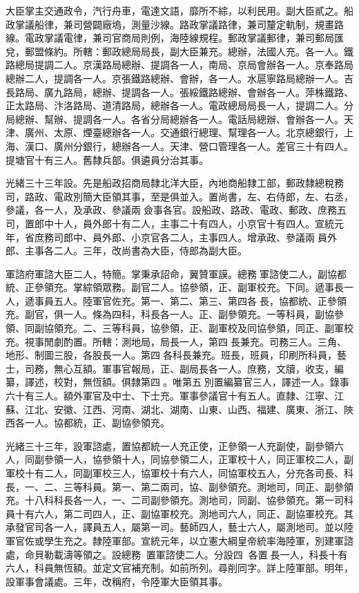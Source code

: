 \begin{pinyinscope}
大臣掌主交通政令，汽行舟車，電達文語，靡所不綜，以利民用。副大臣貳之。船政掌議船律，兼司營闢廠塢，測量沙線。路政掌議路律，兼司釐定軌制，規畫路線。電政掌議電律，兼司官商局則例，海陸線規程。郵政掌議郵律，兼司郵局匯兌，郵盟條約。所轄：郵政總局局長，副大臣兼充。總辦，法國人充。各一人。鐵路總局提調二人。京漢路局總辦、提調各一人，南局、京局會辦各一人。京奉路局總辦二人，提調各一人。京張鐵路總辦、會辦，各一人。水扈寧路局總辦一人。吉長路局、廣九路局，總辦、提調各一人。張綏鐵路總辦、會辦各一人。萍株鐵路、正太路局、汴洛路局、道清路局，總辦各一人。電政總局局長一人，提調二人。分局總辦、幫辦、提調各一人。各省分局總辦各一人。電話局總辦、會辦各一人。天津、廣州、太原、煙臺總辦各一人。交通銀行總理、幫理各一人。北京總銀行，上海、漢口、廣州分銀行，總辦各一人。天津、營口管理各一人。差官三十有四人。提塘官十有三人。舊隸兵部。俱遴員分治其事。

光緒三十三年設。先是船政招商局隸北洋大臣，內地商船隸工部，郵政隸總稅務司，路政、電政別簡大臣領其事，至是俱並入。置尚書，左、右侍郎，左、右丞，參議，各一人，及承政、參議兩僉事各官。設船政、路政、電政、郵政、庶務五司，置郎中十人，員外郎十有二人，主事二十有四人，小京官十有四人。宣統元年，省庶務司郎中、員外郎、小京官各二人，主事四人。增承政、參議兩員外郎、主事各二人。三年，改尚書為大臣，侍郎為副大臣。

軍諮府軍諮大臣二人，特簡。掌秉承詔命，翼贊軍謨。總務軍諮使二人，副協都統、正參領充。掌綜領眾務。副官二人。協參領，正、副軍校充。下同。遞事長一人，遞事員五人。陸軍官佐充。第一、第二、第三、第四各長，協都統、正參領充。副官，俱一人。條為四科，科長各一人。正、副參領充。一等科員，副協參領、同副協領充。二、三等科員，協參領，正、副軍校及同協參領，同正、副軍校充。視事閒劇酌置。所轄：測地局，局長一人，第四長兼充。司務三人。三角、地形、制圖三股，各股長一人。第四各科長兼充。班長，班員，印刷所科員，藝士，司務，無心互額。軍事官報局，正、副局長各一人。庶務，文牘，收支，編纂，譯述，校對，無恆額。俱隸第四。唯第五別置編纂官三人，譯述一人。錄事六十有三人。額外軍官及中士、下士充。軍事參議官十有五人。直隸、江寧、江蘇、江北、安徽、江西、河南、湖北、湖南、山東、山西、福建、廣東、浙江、陜西各一人。協都統，正、副協參領充。

光緒三十三年，設軍諮處，置協都統一人充正使，正參領一人充副使，副參領六人，同副參領一人，協參領十人，同協參領二人，正軍校十人，同正軍校二人，副軍校十有二人，同副軍校三人，協軍校十有六人，同協軍校五人，分充各司長、科長，一、二、三等科員。第一、第二兩司，協、副參領充。測地司，同正、副參領充。十八科科長各一人，一、二司副參領充。測地司，同副、協參領充。第一司科員十有六人，第二司四人，正、副協軍校充。測地司六人，同正、副協軍校充。其承發官司各一人，譯員五人，屬第一司。藝師四人，藝士六人，屬測地司。並以陸軍官佐或學生充之。隸陸軍部。宣統元年，以立憲大綱皇帝統率海陸軍，別建軍諮處，命貝勒載濤等領之。設總務，置軍諮使二人。分設四，各置長一人，科長十有六人，科員無恆額。並定文官補充制。如前所列。尋削同字。詳上陸軍部。明年，設軍事會議處。三年，改稱府，令陸軍大臣領其事。


\end{pinyinscope}
